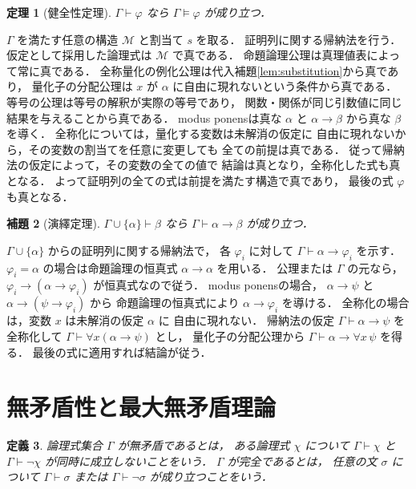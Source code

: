 \documentclass[a5paper,10pt,onecolumn]{jsarticle}
\makeatletter
\theoremstyle{mathnotetheorem}
\newtheorem{theorem}{定理}[section]
\newtheorem{definition}[theorem]{定義}
\newtheorem{lemma}[theorem]{補題}
\renewcommand{\proofname}{証明}
\renewenvironment{proof}[1][\proofname]{%
  \par\pushQED{\qed}\normalfont\topsep4\p@\@plus2\p@\relax
  \trivlist\item[\hskip\labelsep\bfseries #1]\ignorespaces
}{\popQED\endtrivlist\@endpefalse}
\makeatother
\begin{document}
\begin{theorem}[健全性定理]\label{thm:soundness}
$\Gamma\vdash\varphi$ なら
$\Gamma\models\varphi$ が成り立つ．
\end{theorem}
\begin{proof}
$\Gamma$ を満たす任意の構造 $\mathcal M$ と割当て $s$ を取る．
証明列に関する帰納法を行う．
仮定として採用した論理式は
$\mathcal M$ で真である．
命題論理公理は真理値表によって常に真である．
全称量化の例化公理は代入補題\ref{lem:substitution}から真であり，
量化子の分配公理は
$x$ が $\alpha$ に自由に現れないという条件から真である．
等号の公理は等号の解釈が実際の等号であり，
関数・関係が同じ引数値に同じ結果を与えることから真である．
modus ponensは真な $\alpha$ と
$\alpha\to\beta$ から真な $\beta$ を導く．
全称化については，量化する変数は未解消の仮定に
自由に現れないから，その変数の割当てを任意に変更しても
全ての前提は真である．
従って帰納法の仮定によって，その変数の全ての値で
結論は真となり，全称化した式も真となる．
よって証明列の全ての式は前提を満たす構造で真であり，
最後の式 $\varphi$ も真となる．
\end{proof}

\begin{lemma}[演繹定理]\label{lem:deduction}
$\Gamma\cup\{\alpha\}\vdash\beta$ なら
$\Gamma\vdash\alpha\to\beta$ が成り立つ．
\end{lemma}
\begin{proof}
$\Gamma\cup\{\alpha\}$ からの証明列に関する帰納法で，
各 $\varphi_i$ に対して
$\Gamma\vdash\alpha\to\varphi_i$ を示す．
$\varphi_i=\alpha$ の場合は命題論理の恒真式
$\alpha\to\alpha$ を用いる．
公理または $\Gamma$ の元なら，
$\varphi_i\to(\alpha\to\varphi_i)$ が恒真式なので従う．
modus ponensの場合，
$\alpha\to\psi$ と
$\alpha\to(\psi\to\varphi_i)$ から
命題論理の恒真式により $\alpha\to\varphi_i$ を導ける．
全称化の場合は，変数 $x$ は未解消の仮定 $\alpha$ に
自由に現れない．
帰納法の仮定 $\Gamma\vdash\alpha\to\psi$ を
全称化して $\Gamma\vdash\forall x(\alpha\to\psi)$ とし，
量化子の分配公理から
$\Gamma\vdash\alpha\to\forall x\,\psi$ を得る．
最後の式に適用すれば結論が従う．
\end{proof}

\section{無矛盾性と最大無矛盾理論}

\begin{definition}
論理式集合 $\Gamma$ が\emph{無矛盾}であるとは，
ある論理式 $\chi$ について
$\Gamma\vdash\chi$ と
$\Gamma\vdash\neg\chi$ が同時に成立しないことをいう．
$\Gamma$ が完全であるとは，
任意の文 $\sigma$ について
$\Gamma\vdash\sigma$ または
$\Gamma\vdash\neg\sigma$ が成り立つことをいう．
\end{definition}
\end{document}
